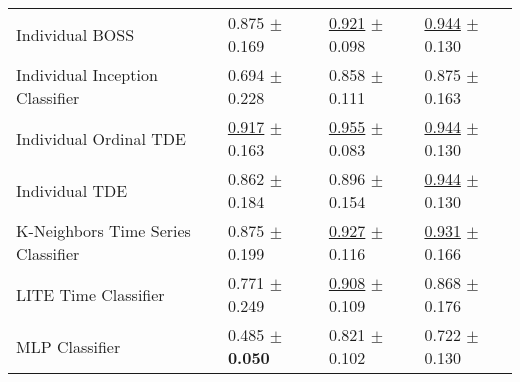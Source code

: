 \begin{tabular}{llll}
Individual BOSS & \textcolor[rgb]{0.1380753138,0.5000000000,0}{0.875} $\pm$ \textcolor[rgb]{0.5860875168,0.4139124832,0}{0.169} & \underline{\textcolor[rgb]{0.2985781991,0.5000000000,0}{0.921}} $\pm$ \textcolor[rgb]{0.3601483136,0.5000000000,0}{0.098} & \underline{\textcolor[rgb]{0.1111111111,0.5000000000,0}{0.944}} $\pm$ \textcolor[rgb]{0.3121982484,0.5000000000,0}{0.130} \\
Individual Inception Classifier & \textcolor[rgb]{0.5369595537,0.4630404463,0}{0.694} $\pm$ \textcolor[rgb]{0.8828427405,0.1171572595,0}{0.228} & \textcolor[rgb]{0.6767772512,0.3232227488,0}{0.858} $\pm$ \textcolor[rgb]{0.5033778172,0.4966221828,0}{0.111} & \textcolor[rgb]{0.3888888889,0.5000000000,0}{0.875} $\pm$ \textcolor[rgb]{0.6233059939,0.3766940061,0}{0.163} \\
Individual Ordinal TDE & \underline{\textcolor[rgb]{0.0460251046,0.5000000000,0}{0.917}} $\pm$ \textcolor[rgb]{0.5577723962,0.4422276038,0}{0.163} & \underline{\textcolor[rgb]{0.0995260664,0.5000000000,0}{0.955}} $\pm$ \textcolor[rgb]{0.1853514393,0.5000000000,0}{0.083} & \underline{\textcolor[rgb]{0.1111111111,0.5000000000,0}{0.944}} $\pm$ \textcolor[rgb]{0.3121982484,0.5000000000,0}{0.130} \\
Individual TDE & \textcolor[rgb]{0.1656903766,0.5000000000,0}{0.862} $\pm$ \textcolor[rgb]{0.6604374232,0.3395625768,0}{0.184} & \textcolor[rgb]{0.4478672986,0.5000000000,0}{0.896} $\pm$ \textcolor[rgb]{1.0000000000,0.0000000000,0}{0.154} & \underline{\textcolor[rgb]{0.1111111111,0.5000000000,0}{0.944}} $\pm$ \textcolor[rgb]{0.3121982484,0.5000000000,0}{0.130} \\
K-Neighbors Time Series Classifier & \textcolor[rgb]{0.1380753138,0.5000000000,0}{0.875} $\pm$ \textcolor[rgb]{0.7390823473,0.2609176527,0}{0.199} & \underline{\textcolor[rgb]{0.2654028436,0.5000000000,0}{0.927}} $\pm$ \textcolor[rgb]{0.5603646102,0.4396353898,0}{0.116} & \underline{\textcolor[rgb]{0.1666666667,0.5000000000,0}{0.931}} $\pm$ \textcolor[rgb]{0.6500947039,0.3499052961,0}{0.166} \\
LITE Time Classifier & \textcolor[rgb]{0.3682008368,0.5000000000,0}{0.771} $\pm$ \textcolor[rgb]{0.9849172203,0.0150827797,0}{0.249} & \underline{\textcolor[rgb]{0.3791469194,0.5000000000,0}{0.908}} $\pm$ \textcolor[rgb]{0.4840348943,0.5000000000,0}{0.109} & \textcolor[rgb]{0.4166666667,0.5000000000,0}{0.868} $\pm$ \textcolor[rgb]{0.7404054892,0.2595945108,0}{0.176} \\
MLP Classifier & \textcolor[rgb]{1.0000000000,0.0000000000,0}{0.485} $\pm$ \textbf{\textcolor[rgb]{0.0000000000,0.5000000000,0}{0.050}} & \textcolor[rgb]{0.8957345972,0.1042654028,0}{0.821} $\pm$ \textcolor[rgb]{0.3997551421,0.5000000000,0}{0.102} & \textcolor[rgb]{1.0000000000,0.0000000000,0}{0.722} $\pm$ \textcolor[rgb]{0.3121982484,0.5000000000,0}{0.130} \\

\end{tabular}
